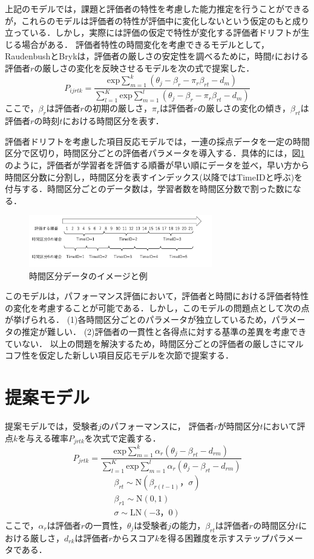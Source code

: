 \documentclass[dvipdfmx, twocolumn, a4paper]{hcresume}
\begin{document}
上記のモデルでは，課題と評価者の特性を考慮した能力推定を行うことができるが，これらのモデルは評価者の特性が評価中に変化しないという仮定のもと成り立っている．しかし，実際には評価の仮定で特性が変化する評価者ドリフトが生じる場合がある．
評価者特性の時間変化を考慮できるモデルとして，RaudenbushとBryk\cite{Raudenbush}は，評価者の厳しさの安定性を調べるために，時間$t$における評価者$r$の厳しさの変化を反映させるモデルを次の式で提案した．
\begin{displaymath}
  P_{ijrtk}=\frac{\mathrm{exp}\sum_{m=1}^{k}(\theta_{j}-\beta_{r} - \pi_{r}\beta_{rt}-d_{m})}{\sum_{l=1}^{K}\mathrm{exp}\sum_{m=1}^{l}(\theta_{j}-\beta_{r} - \pi_{r}\beta_{rt}-d_{m})}
\end{displaymath}
ここで，$\beta_{r}$は評価者$r$の初期の厳しさ，$\pi_{r}$は評価者$r$の厳しさの変化の傾き，$\beta_{rt}$は評価者$r$の時刻$t$における時間区分を表す．

評価者ドリフトを考慮した項目反応モデルでは，一連の採点データを一定の時間区分で区切り，時間区分ごとの評価者パラメータを導入する．具体的には，図\ref{timeid}のように，評価者が学習者を評価する順番が早い順にデータを並べ，早い方から時間区分数に分割し，時間区分を表すインデックス(以降ではTimeIDと呼ぶ)を付与する．時間区分ごとのデータ数は，学習者数を時間区分数で割った数になる．
\begin{figure}[t]
  \centering
  \includegraphics[width=8cm]{img/timeid.png}
  \caption{時間区分データのイメージと例}
  \label{timeid}
\end{figure}
このモデルは，パフォーマンス評価において，評価者と時間における評価者特性の変化を考慮することが可能である．しかし，このモデルの問題点として次の点が挙げられる．
(1)各時間区分ごとのパラメータが独立しているため，パラメータの推定が難しい．
(2)評価者の一貫性と各得点に対する基準の差異を考慮できていない．
以上の問題を解決するため，時間区分ごとの評価者の厳しさにマルコフ性を仮定した新しい項目反応モデルを次節で提案する．
\section{提案モデル}
提案モデルでは，受験者$j$のパフォーマンスに， 評価者$r$が時間区分$t$において評点$k$を与える確率$P_{jrtk}$を次式で定義する．
\begin{displaymath}
  P_{jrtk}=\frac{\mathrm{exp}\sum^k_{m=1}{\alpha_r(\theta_{j}-\beta_{rt}-d_{rm})}}{\sum^K_{l=1} \mathrm{exp}\sum^l_{m=1}{\alpha_r(\theta_{j}-\beta_{rt}-d_{rm})}}
\end{displaymath}
\begin{eqnarray}
  \beta_{rt}\sim \mathrm{N}(\beta_{r(t-1)}，\sigma)\nonumber\\
  \beta_{r1} \sim \mathrm{N}(0,1)\nonumber\\
  \sigma \sim \mathrm{LN}(-3，0)\nonumber
\end{eqnarray}
ここで，$\alpha_{r}$は評価者$r$の一貫性，$\theta_{j}$は受験者$j$の能力，$\beta_{rt}は$評価者$r$の時間区分$t$における厳しさ，$d_{rk}$は評価者$r$からスコア$k$を得る困難度を示すステップパラメータである．
\end{document}
